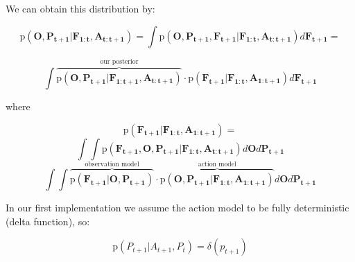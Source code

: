 \documentclass[11pt]{article}
\newcommand{\SetOf}[1]{\mathbf{#1}} %
\newcommand{\prob}[1]{\text{p}(#1)} %
\begin{document}
	We can obtain this distribution by:

	\[
	\prob{\SetOf{O},\SetOf{P_{t+1}}|\SetOf{F_{1:t}},\SetOf{A_{t:t+1}}} =
	 \int \prob{\SetOf{O},\SetOf{P_{t+1}}, \SetOf{F_{t+1}}|\SetOf{F_{1:t}},\SetOf{A_{t:t+1}}} d\SetOf{F_{t+1}} =  
	\]

	\[
	\int \overbrace{\prob{\SetOf{O},\SetOf{P_{t+1}}|\SetOf{F_{1:t+1}},\SetOf{A_{t:t+1}}}}^\text{our posterior} \cdot \prob{\SetOf{F_{t+1}}|\SetOf{F_{1:t}}, \SetOf{A_{1:t+1}}} d\SetOf{F_{t+1}}
	\]

	where 

	\[
	\prob{\SetOf{F_{t+1}}|\SetOf{F_{1:t}}, \SetOf{A_{1:t+1}}} =
	\]
	\[
	\int \int \prob{ \SetOf{F_{t+1}}, \SetOf{O}, \SetOf{P_{t+1}}| \SetOf{F_{1:t}},\SetOf{A_{t:t+1}}} d\SetOf{O} d\SetOf{P_{t+1}}
	\]
	\[
	\int \int \overbrace{\prob{ \SetOf{F_{t+1}}|\SetOf{O},\SetOf{P_{t+1}}}}^\text{observation model} \cdot \overbrace{\prob{\SetOf{O},\SetOf{P_{t+1}}| \SetOf{F_{1:t}},\SetOf{A_{1:t+1}}}}^\text{action model} d\SetOf{O} d\SetOf{P_{t+1}}
	\]

	In our first implementation we assume the action model to be fully deterministic (delta function), so:

	\[
	\prob{ P_{t+1}|A_{t+1}, P_t} = \delta(p_{t+1})
	\]


 



\end{document}

